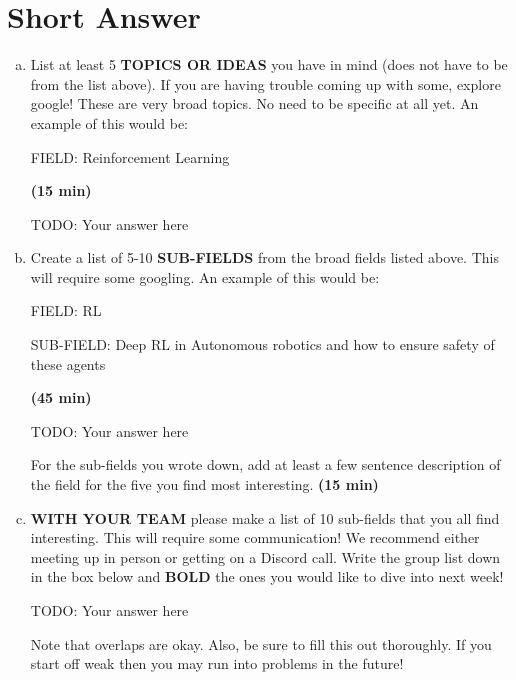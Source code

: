 \documentclass[letterpaper,11pt]{article}
\begin{document}
\section{Short Answer}
\begin{enumerate}[a)]
\item List at least 5 \textbf{TOPICS OR IDEAS} you have in mind (does not have to be from the list above). If you are having trouble coming up with some, explore google! These are very broad topics. No need to be specific at all yet. An example of this would be: 

FIELD: Reinforcement Learning

\textbf{(15 min)}

\begin{tcolorbox}
TODO: Your answer here
\newline
\newline
\newline
\newline
\newline
\end{tcolorbox}

\item Create a list of 5-10 \textbf{SUB-FIELDS} from the broad fields listed above. This will require some googling. An example of this would be: 

FIELD: RL 

SUB-FIELD: Deep RL in Autonomous robotics and how to ensure safety of these agents

\textbf{(45 min)}

\begin{tcolorbox}
TODO: Your answer here
\newline
\newline
\newline
\newline
\newline
\end{tcolorbox}

For the sub-fields you wrote down, add at least a few sentence description of the field for the five you find most interesting. \textbf{(15 min)}

\item \textbf{WITH YOUR TEAM} please make a list of 10 sub-fields that you all find interesting. This will require some communication! We recommend either meeting up in person or getting on a Discord call. Write the group list down in the box below and \textbf{BOLD} the ones you would like to dive into next week!

\begin{tcolorbox}
TODO: Your answer here
\newline
\newline
\newline
\newline
\newline
\end{tcolorbox}

Note that overlaps are okay. Also, be sure to fill this out thoroughly. If you start off weak then you may run into problems in the future!
    
\end{enumerate}
\end{document}
